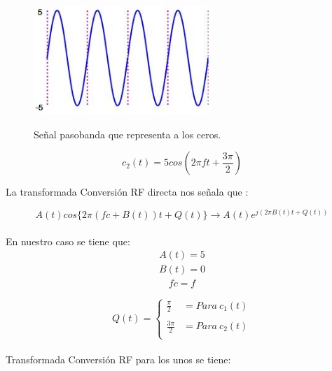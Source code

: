  \begin{figure}[h!]
	\captionsetup{justification = raggedright, singlelinecheck = false}
    \caption{Señal pasobanda que representa a los ceros.}
    \centering
    \includegraphics[width=0.6\textwidth]{Imagenes/ceros.JPG}
    \label{fig:respuestadeunos}
\end{figure}

\begin{equation}  \label{capdos_treintauno}
c_{2}(t)=5cos(2\pi ft+\frac{3\pi}{2})
\end{equation}

La transformada Conversión RF directa nos señala que :

\begin{equation} \label{capdos_treintados}
A(t)cos\{2\pi(fc+B(t))t+Q(t)\}\longrightarrow A(t)e^{j(2\pi B(t)t+Q(t))}
\end{equation}
\\

En nuestro caso se tiene que:
\begin{align*}
A(t)=5
\end{align*}
\begin{align*}
B(t)=0
\end{align*}
\begin{align*}
fc=f
\end{align*}

\begin{equation} \label{capdos_treintatres}
Q(t)= \left\{ \begin{array}{lcc}
             \frac{\pi}{2} & = Para\ c_{1}(t) \\
             \\ \frac{3\pi}{2} & = Para\ c_{2}(t) \\
            
             \end{array}
   \right.
\end{equation}\\

Transformada Conversión RF para los unos se tiene:


